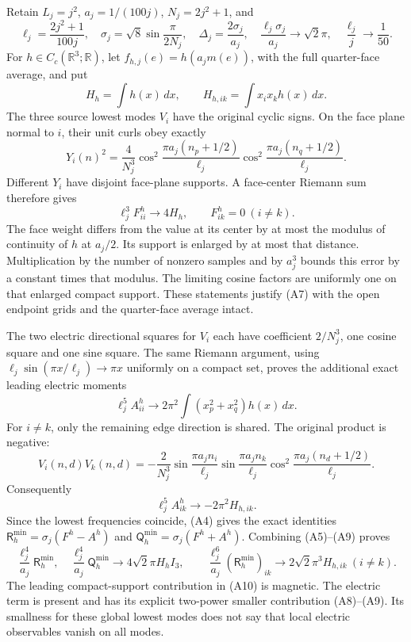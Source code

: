 \documentclass[
  11pt,
]{article}
\begin{document}
Retain \(L_j=j^2\), \(a_j=1/(100j)\), \(N_j=2j^2+1\), and \[
 \ell_j=\frac{2j^2+1}{100j},\quad
 \sigma_j=\sqrt8\sin\frac{\pi}{2N_j},\quad
 \Delta_j=\frac{2\sigma_j}{a_j},\quad
 \frac{\ell_j\sigma_j}{a_j}\longrightarrow\sqrt2\pi,\quad
 \frac{\ell_j}{j}\longrightarrow\frac1{50}.
\tag{A5}
\] For \(h\in C_c(\mathbb R^3;\mathbb R)\), let
\(f_{h,j}(e)=h(a_jm(e))\), with the full quarter-face average, and put
\[
 H_h=\int h(x)\,dx,\qquad H_{h,ik}=\int x_ix_kh(x)\,dx.
\] The three source lowest modes \(V_i\) have the original cyclic signs.
On the face plane normal to \(i\), their unit curls obey exactly \[
 Y_i(n)^2=\frac4{N_j^3}
 \cos^2\frac{\pi a_j(n_p+1/2)}{\ell_j}
 \cos^2\frac{\pi a_j(n_q+1/2)}{\ell_j}.
\tag{A6}
\] Different \(Y_i\) have disjoint face-plane supports. A face-center
Riemann sum therefore gives \[
 \ell_j^3F^h_{ii}\longrightarrow4H_h,\qquad F^h_{ik}=0\ (i\ne k).
\tag{A7}
\] The face weight differs from the value at its center by at most the
modulus of continuity of \(h\) at \(a_j/2\). Its support is enlarged by
at most that distance. Multiplication by the number of nonzero samples
and by \(a_j^3\) bounds this error by a constant times that modulus. The
limiting cosine factors are uniformly one on that enlarged compact
support. These statements justify (A7) with the open endpoint grids and
the quarter-face average intact.

The two electric directional squares for \(V_i\) each have coefficient
\(2/N_j^3\), one cosine square and one sine square. The same Riemann
argument, using \(\ell_j\sin(\pi x/\ell_j)\to\pi x\) uniformly on a
compact set, proves the additional exact leading electric moments \[
 \ell_j^5 A^h_{ii}\longrightarrow
 2\pi^2\int(x_p^2+x_q^2)h(x)\,dx.
\tag{A8}
\] For \(i\ne k\), only the remaining edge direction is shared. The
original product is negative: \[
 V_i(n,d)V_k(n,d)=-\frac2{N_j^3}
 \sin\frac{\pi a_jn_i}{\ell_j}
 \sin\frac{\pi a_jn_k}{\ell_j}
 \cos^2\frac{\pi a_j(n_d+1/2)}{\ell_j}.
\] Consequently \[
 \ell_j^5A^h_{ik}\longrightarrow-2\pi^2H_{h,ik}.
\tag{A9}
\] Since the lowest frequencies coincide, (A4) gives the exact
identities \(\mathsf R_h^{\min}=\sigma_j(F^h-A^h)\) and
\(\mathsf Q_h^{\min}=\sigma_j(F^h+A^h)\). Combining (A5)--(A9) proves \[
 \frac{\ell_j^4}{a_j}\mathsf R_h^{\min},\quad
 \frac{\ell_j^4}{a_j}\mathsf Q_h^{\min}
 \longrightarrow4\sqrt2\pi H_h I_3,
\qquad
 \frac{\ell_j^6}{a_j}(\mathsf R_h^{\min})_{ik}
 \longrightarrow2\sqrt2\pi^3H_{h,ik}\ (i\ne k).
\tag{A10}
\] The leading compact-support contribution in (A10) is magnetic. The
electric term is present and has its explicit two-power smaller
contribution (A8)--(A9). Its smallness for these global lowest modes
does not say that local electric observables vanish on all modes.
\end{document}
